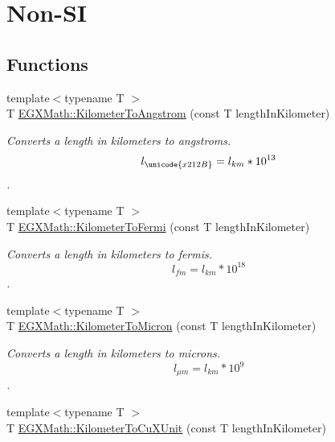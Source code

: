 \hypertarget{group___e_g_x_math-_conversions-_length_conversions-_s_i-_kilometer-_non-_s_i}{}\section{Non-\/\+SI}
\label{group___e_g_x_math-_conversions-_length_conversions-_s_i-_kilometer-_non-_s_i}
\subsection*{Functions}
\begin{DoxyCompactItemize}
\item 
{\footnotesize template$<$typename T $>$ }\\T \mbox{\hyperlink{group___e_g_x_math-_conversions-_length_conversions-_s_i-_kilometer-_non-_s_i_ga415a412a1b03916d6071a206a3318035}{E\+G\+X\+Math\+::\+Kilometer\+To\+Angstrom}} (const T length\+In\+Kilometer)
\begin{DoxyCompactList}\small\item\em Converts a length in kilometers to angstroms. \[ l_{\unicode{x212B}}=l_{km} * 10^{13} \]. \end{DoxyCompactList}\item 
{\footnotesize template$<$typename T $>$ }\\T \mbox{\hyperlink{group___e_g_x_math-_conversions-_length_conversions-_s_i-_kilometer-_non-_s_i_ga9c38d019deb86a60173d5d2b65a1ef57}{E\+G\+X\+Math\+::\+Kilometer\+To\+Fermi}} (const T length\+In\+Kilometer)
\begin{DoxyCompactList}\small\item\em Converts a length in kilometers to fermis. \[ l_{fm}=l_{km} * 10^{18} \]. \end{DoxyCompactList}\item 
{\footnotesize template$<$typename T $>$ }\\T \mbox{\hyperlink{group___e_g_x_math-_conversions-_length_conversions-_s_i-_kilometer-_non-_s_i_gae662bafe0d1fc36276a336fd969307a0}{E\+G\+X\+Math\+::\+Kilometer\+To\+Micron}} (const T length\+In\+Kilometer)
\begin{DoxyCompactList}\small\item\em Converts a length in kilometers to microns. \[ l_{\mu m}=l_{km} * 10^{9} \]. \end{DoxyCompactList}\item 
{\footnotesize template$<$typename T $>$ }\\T \mbox{\hyperlink{group___e_g_x_math-_conversions-_length_conversions-_s_i-_kilometer-_non-_s_i_ga0614eb6a9e8bf1a9ba6cf51121f22083}{E\+G\+X\+Math\+::\+Kilometer\+To\+Cu\+X\+Unit}} (const T length\+In\+Kilometer)

\end{DoxyCompactItemize}
